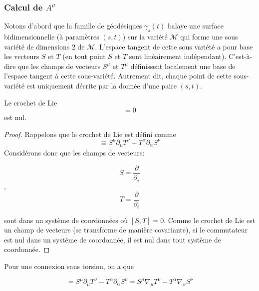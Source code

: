 \subsubsection{Calcul de $A^\mu$}
Notons d'abord que la famille de géodésiques $\gamma_{s}(t)$ balaye une surface bidimensionnelle (à paramètres $(s,t)$) sur la variété $\mathcal{M}$ qui forme une sous variété de dimensions $2$ de $\mathcal{M}$. L'espace tangent de cette sous variété a pour base les vecteurs $S$ et $T$ (en tout point $S$ et $T$ sont linéairement indépendant). C'est-à-dire que les champs de vecteurs $S^{\mu}$ et $T^{\mu}$ définissent localement une base de l'espace tangent à cette sous-variété. Autrement dit, chaque point de cette sous-variété est uniquement décrite par la donnée d'une paire $(s,t)$.
\begin{theoremframe}
    \begin{propri} 
        Le crochet de Lie
        \begin{equation}
            [S,T] = 0
        \end{equation}
        est nul.
    \end{propri}
\end{theoremframe}
\begin{proof}

Rappelons que le crochet de Lie est défini comme
\begin{equation}
[S,T] \equiv S^{\mu}\partial_{\mu}T^{\nu} - T^{\alpha}\partial_{\alpha}S^{\nu}
\end{equation}
Considérons donc que les champs de vecteurs:

$$S = \frac{\partial}{\partial_{s}}$$, $$T = \frac{\partial}{\partial_{t}}$$

sont dans un système de coordonnées où $[S, T] = 0$. Comme le crochet de Lie est un champ de vecteurs (se transforme de manière covariante), si le commutateur est nul dans un système de coordonnée, il est nul dans tout système de coordonnée.
\end{proof}
\begin{theoremframe}
    \begin{propri}
        Pour une connexion sans torsion, on a que 

        \begin{equation}
            [S,T] = S^{\mu}\partial_{\mu}T^{\nu} - T^{\alpha}\partial_{\alpha}S^{\nu} = S^{\mu}\nabla_{\mu}T^{\nu} - T^{\alpha}\nabla_{\alpha}S^{\nu}
        \end{equation}
    \end{propri}
\end{theoremframe}

